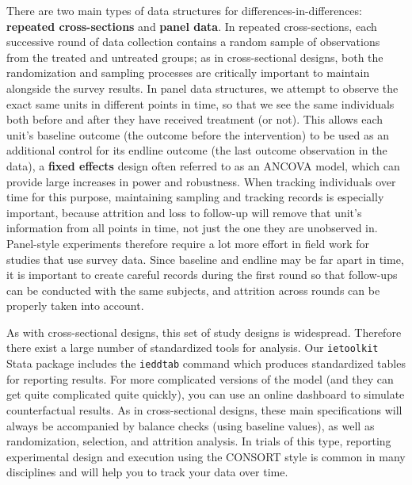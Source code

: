 There are two main types of data structures for differences-in-differences:
\textbf{repeated cross-sections} and \textbf{panel data}.
In repeated cross-sections, each successive round of data collection contains a random sample
of observations from the treated and untreated groups;
as in cross-sectional designs, both the randomization and sampling processes
are critically important to maintain alongside the survey results.
In panel data structures, we attempt to observe the exact same units
in different points in time, so that we see the same individuals
both before and after they have received treatment (or not).
This allows each unit's baseline outcome (the outcome before the intervention) to be used
as an additional control for its endline outcome (the last outcome observation in the data),
a \textbf{fixed effects} design often referred to as an ANCOVA model,
which can provide large increases in power and robustness.
When tracking individuals over time for this purpose,
maintaining sampling and tracking records is especially important,
because attrition and loss to follow-up will remove that unit's information
from all points in time, not just the one they are unobserved in.
Panel-style experiments therefore require a lot more effort in field work
for studies that use survey data.
Since baseline and endline may be far apart in time,
it is important to create careful records during the first round
so that follow-ups can be conducted with the same subjects,
and attrition across rounds can be properly taken into account.

As with cross-sectional designs, this set of study designs is widespread.
Therefore there exist a large number of standardized tools for analysis.
Our \texttt{ietoolkit} Stata package includes the \texttt{ieddtab} command
which produces standardized tables for reporting results.
For more complicated versions of the model
(and they can get quite complicated quite quickly),
you can use an online dashboard to simulate counterfactual results.
As in cross-sectional designs, these main specifications
will always be accompanied by balance checks (using baseline values),
as well as randomization, selection, and attrition analysis.
In trials of this type, reporting experimental design and execution
using the CONSORT style is common in many disciplines
and will help you to track your data over time.\cite{schulz2010consort}

